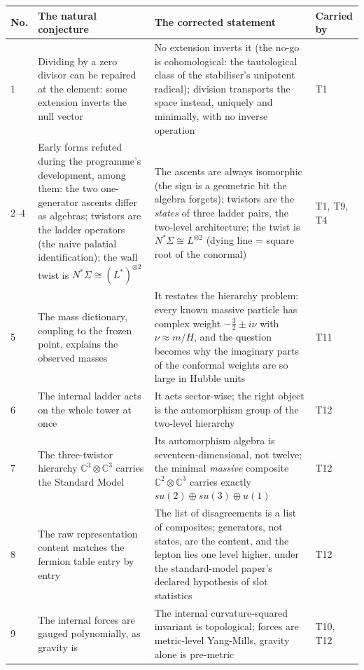 \documentclass[11pt]{article}
\theoremstyle{definition}
\newcommand{\C}{\mathbb{C}}
\begin{document}
\begingroup\small
\begin{longtable}{p{} p{} p{} p{}}
\toprule
\textbf{No.} & \textbf{The natural conjecture} & \textbf{The corrected statement} & \textbf{Carried by} \\
\midrule
\endhead
1 & Dividing by a zero divisor can be repaired at the element: some extension inverts the null vector & No extension inverts it (the no-go is cohomological: the tautological class of the stabiliser's unipotent radical); division transports the space instead, uniquely and minimally, with no inverse operation & T1 \\
2--4 & Early forms refuted during the programme's development, among them: the two one-generator ascents differ as algebras; twistors are the ladder operators (the naive palatial identification); the wall twist is $N^{*}\Sigma \cong (L^{*})^{\otimes 2}$ & The ascents are always isomorphic (the sign is a geometric bit the algebra forgets); twistors are the \emph{states} of three ladder pairs, the two-level architecture; the twist is $N^{*}\Sigma \cong L^{\otimes 2}$ (dying line = square root of the conormal) & T1, T9, T4 \\
5 & The mass dictionary, coupling to the frozen point, explains the observed masses & It restates the hierarchy problem: every known massive particle has complex weight $-\tfrac32 \pm i\nu$ with $\nu \approx m/H$, and the question becomes why the imaginary parts of the conformal weights are so large in Hubble units & T11 \\
6 & The internal ladder acts on the whole tower at once & It acts sector-wise; the right object is the automorphism group of the two-level hierarchy & T12 \\
7 & The three-twistor hierarchy $\C^{3}\otimes\C^{3}$ carries the Standard Model & Its automorphism algebra is seventeen-dimensional, not twelve; the minimal \emph{massive} composite $\C^{2}\otimes\C^{3}$ carries exactly $su(2)\oplus su(3)\oplus u(1)$ & T12 \\
8 & The raw representation content matches the fermion table entry by entry & The list of disagreements is a list of composites; generators, not states, are the content, and the lepton lies one level higher, under the standard-model paper's declared hypothesis of slot statistics & T12 \\
9 & The internal forces are gauged polynomially, as gravity is & The internal curvature-squared invariant is topological; forces are metric-level Yang-Mills, gravity alone is pre-metric & T10, T12 \\

\end{longtable}
\end{document}
